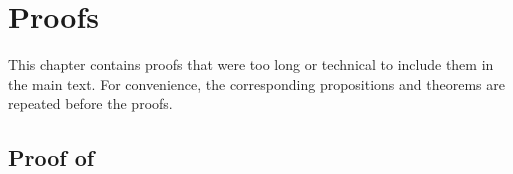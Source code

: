 \chapter{Proofs}

This chapter contains proofs that
were too long or technical to include them in the main text.
For convenience, the corresponding propositions and theorems are repeated
before the proofs.



\section[Proof of Proposition~\ref*{prop:gridSizeCoarseBoundary}]{%
  Proof of \texorpdfstring{%
  }{%
    Proposition \ref{prop:gridSizeCoarseBoundary}%
  }%
}
\label{sec:proofGridSizeCoarseBoundary}

\propGridSizeCoarseBoundary*

